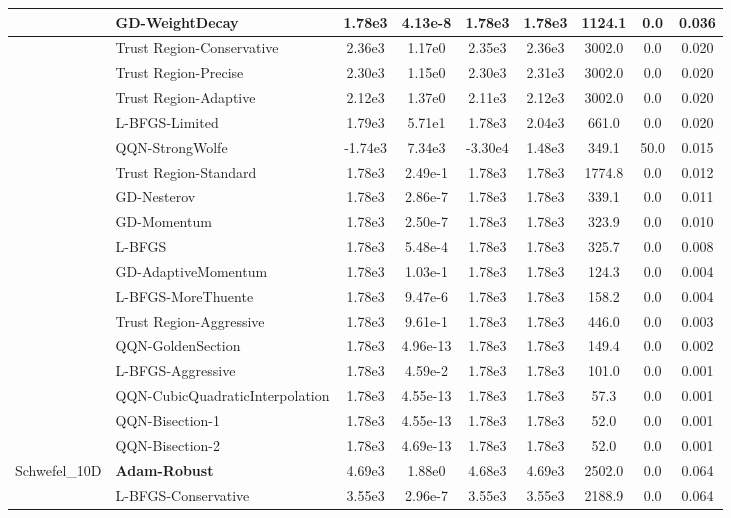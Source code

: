 \documentclass[10pt]{article}
\begin{document}
\begin{longtable}{|l|l|c|c|c|c|c|c|c|}
\hline
 & GD-WeightDecay & 1.78e3 & 4.13e-8 & 1.78e3 & 1.78e3 & 1124.1 & 0.0 & 0.036 \\
\hline
 & Trust Region-Conservative & 2.36e3 & 1.17e0 & 2.35e3 & 2.36e3 & 3002.0 & 0.0 & 0.020 \\
\hline
 & Trust Region-Precise & 2.30e3 & 1.15e0 & 2.30e3 & 2.31e3 & 3002.0 & 0.0 & 0.020 \\
\hline
 & Trust Region-Adaptive & 2.12e3 & 1.37e0 & 2.11e3 & 2.12e3 & 3002.0 & 0.0 & 0.020 \\
\hline
 & L-BFGS-Limited & 1.79e3 & 5.71e1 & 1.78e3 & 2.04e3 & 661.0 & 0.0 & 0.020 \\
\hline
 & QQN-StrongWolfe & -1.74e3 & 7.34e3 & -3.30e4 & 1.48e3 & 349.1 & 50.0 & 0.015 \\
\hline
 & Trust Region-Standard & 1.78e3 & 2.49e-1 & 1.78e3 & 1.78e3 & 1774.8 & 0.0 & 0.012 \\
\hline
 & GD-Nesterov & 1.78e3 & 2.86e-7 & 1.78e3 & 1.78e3 & 339.1 & 0.0 & 0.011 \\
\hline
 & GD-Momentum & 1.78e3 & 2.50e-7 & 1.78e3 & 1.78e3 & 323.9 & 0.0 & 0.010 \\
\hline
 & L-BFGS & 1.78e3 & 5.48e-4 & 1.78e3 & 1.78e3 & 325.7 & 0.0 & 0.008 \\
\hline
 & GD-AdaptiveMomentum & 1.78e3 & 1.03e-1 & 1.78e3 & 1.78e3 & 124.3 & 0.0 & 0.004 \\
\hline
 & L-BFGS-MoreThuente & 1.78e3 & 9.47e-6 & 1.78e3 & 1.78e3 & 158.2 & 0.0 & 0.004 \\
\hline
 & Trust Region-Aggressive & 1.78e3 & 9.61e-1 & 1.78e3 & 1.78e3 & 446.0 & 0.0 & 0.003 \\
\hline
 & QQN-GoldenSection & 1.78e3 & 4.96e-13 & 1.78e3 & 1.78e3 & 149.4 & 0.0 & 0.002 \\
\hline
 & L-BFGS-Aggressive & 1.78e3 & 4.59e-2 & 1.78e3 & 1.78e3 & 101.0 & 0.0 & 0.001 \\
\hline
 & QQN-CubicQuadraticInterpolation & 1.78e3 & 4.55e-13 & 1.78e3 & 1.78e3 & 57.3 & 0.0 & 0.001 \\
\hline
 & QQN-Bisection-1 & 1.78e3 & 4.55e-13 & 1.78e3 & 1.78e3 & 52.0 & 0.0 & 0.001 \\
\hline
 & QQN-Bisection-2 & 1.78e3 & 4.69e-13 & 1.78e3 & 1.78e3 & 52.0 & 0.0 & 0.001 \\
Schwefel\_10D & \textbf{Adam-Robust} & 4.69e3 & 1.88e0 & 4.68e3 & 4.69e3 & 2502.0 & 0.0 & 0.064 \\
\hline
 & L-BFGS-Conservative & 3.55e3 & 2.96e-7 & 3.55e3 & 3.55e3 & 2188.9 & 0.0 & 0.064 \\

\end{longtable}
\end{document}

